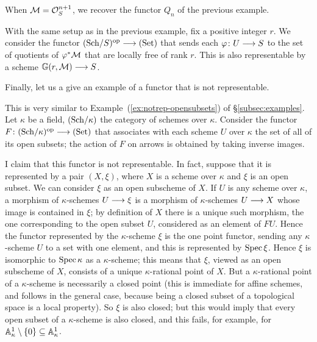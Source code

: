\begin{2   CONTRAVARIANT FUNCTORS}
\begin{2.1 Yoneda Lemma}
\begin{example}
When $\cM = \cO_{S}^{n+1}$, we recover the functor $Q_{n}$ of the previous example.
\end{example}

\begin{example}\label{ex:grassmanians}
With the same setup  as in the previous example, fix a positive integer $r$. We consider the functor $\catsch{S}\op \arr \catset$ that sends each $\phi \colon U \arr S$ to the set of quotients of $\phi^{*}\cM$ that are locally free of rank $r$. This is also representable by a scheme $\GG(r,\cM) \arr S$.
\end{example}


Finally, let us a give an example of a functor that is not representable.

\begin{example} This is very similar to
Example~(\ref{ex:notrep-opensubsets}) of \S\ref{subsec:examples}. Let
$\kappa$ be a field, $\catsch{\kappa}$ the category of schemes over
$\kappa$. Consider the functor $F \colon \catsch{\kappa}\op \arr \catset$
that associates with each scheme $U$ over $\kappa$ the set of all of its
open subsets; the action of $F$ on arrows is obtained by taking inverse
images. 

I claim that this functor is not representable. In fact, suppose that it is represented by a pair $(X, \xi)$, where $X$ is a scheme over $\kappa$ and $\xi$ is an open subset. We can consider $\xi$ as an open subscheme of $X$. If $U$ is any scheme over $\kappa$, a morphism of $\kappa$-schemes $U \arr \xi$ is a  morphism of $\kappa$-schemes $U \arr X$ whose image is contained in $\xi$; by definition of $X$ there is a unique such morphism, the one corresponding to the open subset $U$, considered as an element of $FU$. Hence the functor represented by the $\kappa$-scheme $\xi$ is the one point functor, sending any $\kappa$-scheme $U$ to a set with one element, and this is represented by $\spec \xi$. Hence $\xi$ is isomorphic to $\spec \kappa$ as a $\kappa$-scheme; this means that $\xi$, viewed as an open subscheme of $X$, consists of a unique $\kappa$-rational point of $X$. But a $\kappa$-rational point of a $\kappa$-scheme is necessarily a closed point (this is immediate for affine schemes, and follows in the general case, because being a closed subset of a topological space is a local property). So $\xi$ is also closed; but this would imply that every open subset of a $\kappa$-scheme is also closed, and this fails, for example, for $\AA^1_{\kappa}
\setminus \{0\} \subseteq \AA^1_\kappa$.
\end{example}


\end{2.1 Yoneda Lemma}
\end{2   CONTRAVARIANT FUNCTORS}
